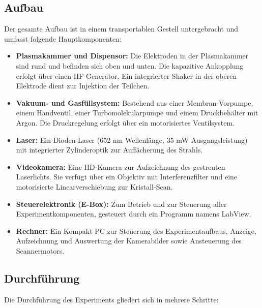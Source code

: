 \documentclass[12pt,a4paper,ngerman]{article}
\begin{document}
\subsection{Aufbau}
Der gesamte Aufbau ist in einem transportablen Gestell untergebracht und umfasst folgende Hauptkomponenten:
\begin{itemize}
    \item \textbf{Plasmakammer und Dispensor:} Die Elektroden in der Plasmakammer sind rund und befinden sich oben und unten. Die kapazitive Ankopplung erfolgt über einen HF-Generator. Ein integrierter Shaker in der oberen Elektrode dient zur Injektion der Teilchen.
    \item \textbf{Vakuum- und Gasfüllsystem:} Bestehend aus einer Membran-Vorpumpe, einem Handventil, einer Turbomolekularpumpe und einem Druckbehälter mit Argon. Die Druckregelung erfolgt über ein motorisiertes Ventilsystem.
    \item \textbf{Laser:} Ein Dioden-Laser (652 nm Wellenlänge, 35 mW Ausgangsleistung) mit integrierter Zylinderoptik zur Auffächerung des Strahls.
    \item \textbf{Videokamera:} Eine HD-Kamera zur Aufzeichnung des gestreuten Laserlichts. Sie verfügt über ein Objektiv mit Interferenzfilter und eine motorisierte Linearverschiebung zur Kristall-Scan.
    \item \textbf{Steuerelektronik (E-Box):} Zum Betrieb und zur Steuerung aller Experimentkomponenten, gesteuert durch ein Programm namens \glqq{}LabView\grqq{}.
    \item \textbf{Rechner:} Ein Kompakt-PC zur Steuerung des Experimentaufbaus, Anzeige, Aufzeichnung und Auswertung der Kamerabilder sowie Ansteuerung des Scannermotors.
\end{itemize}

\newpage
\subsection{Durchführung}
Die Durchführung des Experiments gliedert sich in mehrere Schritte:
\end{document}
